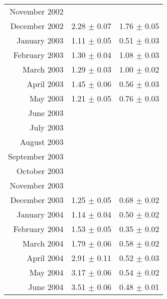 \documentclass[a4paper,12pt]{article}
\begin{document}
\begin{center}
\begin{longtable}{|r|c|c|}
    November    2002    &                               &                               \\
    December    2002    &       2.28    $\pm$   0.07    &       1.76    $\pm$   0.05    \\
    January     2003    &       1.11    $\pm$   0.05    &       0.51    $\pm$   0.03    \\
    February    2003    &       1.30    $\pm$   0.04    &       1.08    $\pm$   0.03    \\
    March       2003    &       1.29    $\pm$   0.03    &       1.00    $\pm$   0.02    \\
    April       2003    &       1.45    $\pm$   0.06    &       0.56    $\pm$   0.03    \\
    May         2003    &       1.21    $\pm$   0.05    &       0.76    $\pm$   0.03    \\
    June        2003    &                               &                               \\
    July        2003    &                               &                               \\
    August      2003    &                               &                               \\
    September   2003    &                               &                               \\
    October     2003    &                               &                               \\
    November    2003    &                               &                               \\
    December    2003    &       1.25    $\pm$   0.05    &       0.68    $\pm$   0.02    \\
    January     2004    &       1.14    $\pm$   0.04    &       0.50    $\pm$   0.02    \\
    February    2004    &       1.53    $\pm$   0.05    &       0.35    $\pm$   0.02    \\
    March       2004    &       1.79    $\pm$   0.06    &       0.58    $\pm$   0.02    \\
    April       2004    &       2.91    $\pm$   0.11    &       0.52    $\pm$   0.03    \\
    May         2004    &       3.17    $\pm$   0.06    &       0.54    $\pm$   0.02    \\
    June        2004    &       3.51    $\pm$   0.06    &       0.48    $\pm$   0.01    \\

\end{longtable}
\end{center}
\end{document}
